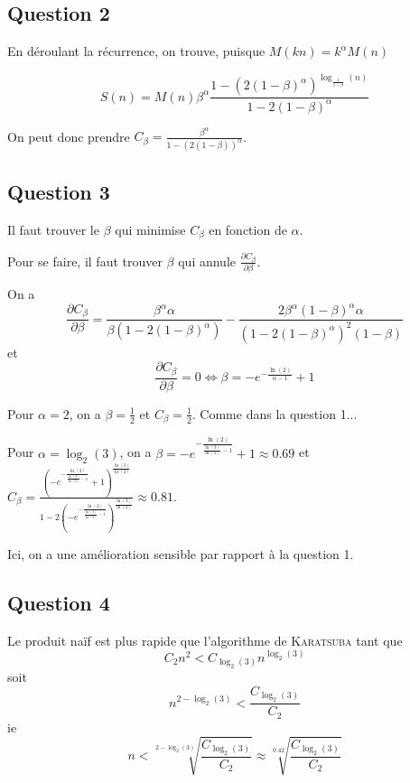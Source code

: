 \subsection*{Question 2}

En déroulant la récurrence, on trouve, puisque $M(kn) = k^\alpha M(n)$

\[
    S(n) = M(n) \beta^\alpha \frac{1-(2(1-\beta)^\alpha)^{\log_{\frac{1}{1-\beta}} (n)}}{1-2(1-\beta)^\alpha}
\]

On peut donc prendre $C_\beta = \frac{\beta^\alpha}{1-(2(1-\beta))^\alpha}$.

\subsection*{Question 3}

Il faut trouver le $\beta$ qui minimise $C_\beta$ en fonction de $\alpha$.

Pour se faire, il faut trouver $\beta$ qui annule $\frac{\partial C_\beta}{\partial \beta}$.

On a 
\[
    \frac{\partial C_\beta}{\partial \beta} =  \frac{\beta^\alpha \alpha}{\beta(1-2(1-\beta)^\alpha)}-\frac{2\beta^\alpha(1-\beta)^\alpha \alpha}{(1-2(1-\beta)^\alpha)^2(1-\beta)}
\]
et
\[
    \frac{\partial C_\beta}{\partial \beta} = 0 \Leftrightarrow \beta = -e^{-\frac{\ln(2)}{\alpha-1}} +1
\]

\bigskip

Pour $\alpha =2$, on a $\beta = \frac{1}{2}$ et $C_\beta = \frac{1}{2}$. Comme dans la question 1...

Pour $\alpha = \log_2(3)$, on a $\beta = -e^{-\frac{\ln(2)}{\frac{\ln(3)}{\ln(2)}-1}}+1\approx 0.69$ et $C_\beta = \frac{\left ( -e^{-\frac{\ln(2)}{\frac{\ln(3)}{\ln(2)}-1}}+1\right)^{\frac{\ln(3)}{\ln(2)}}}{1-2\left ( -e^{-\frac{\ln(2)}{\frac{\ln(3)}{\ln(2)}-1}}\right)^{\frac{\ln(3)}{\ln(2)}}}\approx 0.81$.

Ici, on a une amélioration sensible par rapport à la question 1.

\subsection*{Question 4}

Le produit naïf est plus rapide que l'algorithme de \textsc{Karatsuba} tant que
\[
    C_2 n^2 < C_{\log_2(3)} n^{\log_2(3)}
\]
soit 
\[
    n^{2-\log_2(3)} < \frac{C_{\log_2(3)}}{C_2}
\]
ie
\[
    n < \sqrt[2-\log_2(3)]{\frac{C_{\log_2(3)}}{C_2}} \approx \sqrt[0.42]{\frac{C_{\log_2(3)}}{C_2}}
\]


